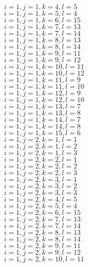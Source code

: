 \documentclass[14pt]{article}
\begin{document}
    $i=1,j=1,k=4,l=5 $ \\ 
    $i=1,j=1,k=5,l=4 $ \\ 
    $i=1,j=1,k=6,l=15 $ \\ 
    $i=1,j=1,k=7,l=13 $ \\ 
    $i=1,j=1,k=7,l=14 $ \\ 
    $i=1,j=1,k=8,l=13 $ \\ 
    $i=1,j=1,k=8,l=14 $ \\ 
    $i=1,j=1,k=9,l=11 $ \\ 
    $i=1,j=1,k=9,l=12 $ \\ 
    $i=1,j=1,k=10,l=11 $ \\ 
    $i=1,j=1,k=10,l=12 $ \\ 
    $i=1,j=1,k=11,l=9 $ \\ 
    $i=1,j=1,k=11,l=10 $ \\ 
    $i=1,j=1,k=12,l=9 $ \\ 
    $i=1,j=1,k=12,l=10 $ \\ 
    $i=1,j=1,k=13,l=7 $ \\ 
    $i=1,j=1,k=13,l=8 $ \\ 
    $i=1,j=1,k=14,l=7 $ \\ 
    $i=1,j=1,k=14,l=8 $ \\ 
    $i=1,j=1,k=15,l=6 $ \\ 
    $i=1,j=2,k=1,l=1 $ \\ 
    $i=1,j=2,k=1,l=2 $ \\ 
    $i=1,j=2,k=1,l=3 $ \\ 
    $i=1,j=2,k=2,l=1 $ \\ 
    $i=1,j=2,k=2,l=2 $ \\ 
    $i=1,j=2,k=2,l=3 $ \\ 
    $i=1,j=2,k=3,l=1 $ \\ 
    $i=1,j=2,k=3,l=2 $ \\ 
    $i=1,j=2,k=3,l=3 $ \\ 
    $i=1,j=2,k=4,l=5 $ \\ 
    $i=1,j=2,k=5,l=4 $ \\ 
    $i=1,j=2,k=6,l=15 $ \\ 
    $i=1,j=2,k=7,l=13 $ \\ 
    $i=1,j=2,k=7,l=14 $ \\ 
    $i=1,j=2,k=8,l=13 $ \\ 
    $i=1,j=2,k=8,l=14 $ \\ 
    $i=1,j=2,k=9,l=11 $ \\ 
    $i=1,j=2,k=9,l=12 $ \\ 
    $i=1,j=2,k=10,l=11 $ \\ 
\end{document}
